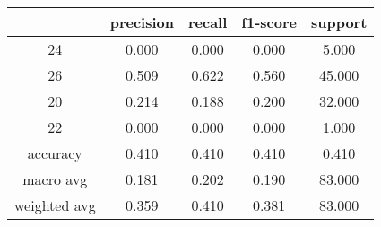 \begin{table}[htb]
    \centering
    \begin{tabular}{@{}ccccc@{}}
        \toprule
         & precision & recall & f1-score & support \\
        \midrule
        24 & 0.000 & 0.000 & 0.000 & 5.000 \\
        26 & 0.509 & 0.622 & 0.560 & 45.000 \\
        20 & 0.214 & 0.188 & 0.200 & 32.000 \\
        22 & 0.000 & 0.000 & 0.000 & 1.000 \\
        accuracy & 0.410 & 0.410 & 0.410 & 0.410 \\
        macro avg & 0.181 & 0.202 & 0.190 & 83.000 \\
        weighted avg & 0.359 & 0.410 & 0.381 & 83.000 \\
        \bottomrule
    \end{tabular}
\end{table}